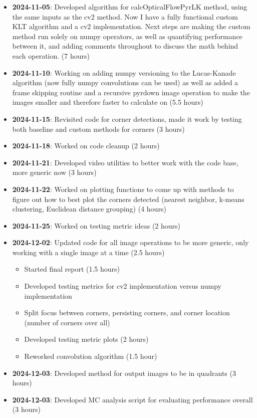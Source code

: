 \documentclass[11pt, conference, letterpaper]{IEEEtran}
\begin{document}
\begin{itemize}
    \item \textbf{2024-11-05}: Developed algorithm for calcOpticalFlowPyrLK method, using the same inputs as the cv2 method. Now I have a fully functional custom KLT algorithm and a cv2 implementation. Next steps are making the custom method run solely on numpy operators, as well as quantifying performance between it, and adding comments throughout to discuss the math behind each operation. (7 hours)
    \item \textbf{2024-11-10}: Working on adding numpy versioning to the Lucas-Kanade algorithm (now fully numpy convolutions can be used) as well as added a frame skipping routine and a recursive pyrdown image operation to make the images smaller and therefore faster to calculate on (5.5 hours)
    \item \textbf{2024-11-15}: Revisited code for corner detections, made it work by testing both baseline and custom methods for corners (3 hours)
    \item \textbf{2024-11-18}: Worked on code cleanup (2 hours)
    \item \textbf{2024-11-21}: Developed video utilities to better work with the code base, more generic now (3 hours)
    \item \textbf{2024-11-22}: Worked on plotting functions to come up with methods to figure out how to best plot the corners detected (nearest neighbor, k-means clustering, Euclidean distance grouping) (4 hours)
    \item \textbf{2024-11-25}: Worked on testing metric ideas (2 hours)
    \item \textbf{2024-12-02}: Updated code for all image operations to be more generic, only working with a single image at a time (2.5 hours)
    \begin{itemize}
        \item Started final report (1.5 hours)
        \item Developed testing metrics for cv2 implementation versus numpy implementation
        \item Split focus between corners, persisting corners, and corner location (number of corners over all)
        \item Developed testing metric plots (2 hours)
        \item Reworked convolution algorithm (1.5 hour)
    \end{itemize}
    \item \textbf{2024-12-03}: Developed method for output images to be in quadrants (3 hours)
    \item \textbf{2024-12-03}: Developed MC analysis script for evaluating performance overall (3 hours)

\end{itemize}
\end{document}
